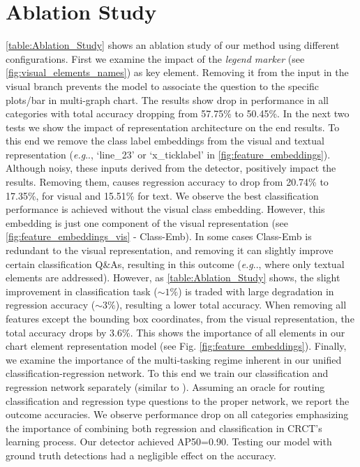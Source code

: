 \documentclass[runningheads]{llncs}
\makeatletter
\newcommand\our[1][]{CRCT\xspace}
\DeclareRobustCommand\onedot{\futurelet\@let@token\@onedot}
\def\@onedot{\ifx\@let@token.\else.\null\fi\xspace}
\def\eg{\emph{e.g}\onedot} \def\Eg{\emph{E.g}\onedot}
\makeatother
\begin{document}
\section{Ablation Study}
 \cref{table:Ablation_Study} shows an ablation study of our method using different configurations. First we examine the impact of the {\it legend marker} (see \cref{fig:visual_elements_names}) as key element. Removing it from the input in the visual branch prevents the model to associate the question to the specific plots/bar in multi-graph chart. The results show drop in performance in all categories with total accuracy dropping from 57.75\% to 50.45\%. In the next two tests we show the impact of representation architecture on the end results. To this end we remove the class label embeddings from the visual and textual representation (\eg, `line\_23' or `x\_ticklabel' in \cref{fig:feature_embeddings}). Although noisy, these inputs derived from the detector, positively impact the results. Removing them, causes regression accuracy to drop from 20.74\% to 17.35\%, for visual and 15.51\% for text. We observe the best classification performance is achieved without the visual class embedding. However, this embedding is just one component of the visual representation (see \cref{fig:feature_embeddings_vis} - Class-Emb). In some cases Class-Emb is redundant to the visual representation, and removing it can slightly improve certain classification Q\&As, resulting in this outcome (\eg, where only textual elements are addressed). However, as \cref{table:Ablation_Study} shows, the slight improvement in classification task ($\sim1\%$) is traded with large degradation in regression accuracy ($\sim3\%$), resulting a lower total accuracy.
When removing all features except the bounding box coordinates, from the visual representation, the total accuracy drops by 3.6\%. This shows the importance of all elements in our chart element representation model (see Fig. \ref{fig:feature_embeddings}). Finally, we examine the importance of the multi-tasking regime inherent in our unified classification-regression network. To this end we train our classification and regression network separately (similar to \cite{plotqa}). Assuming an oracle for routing classification and regression type questions to the proper network, we report the outcome accuracies. We observe performance drop on all categories emphasizing the importance of combining both regression and classification in \our's learning process. Our detector achieved AP50=0.90. Testing our model with ground truth detections had a negligible effect on the accuracy.
 
\end{document}
